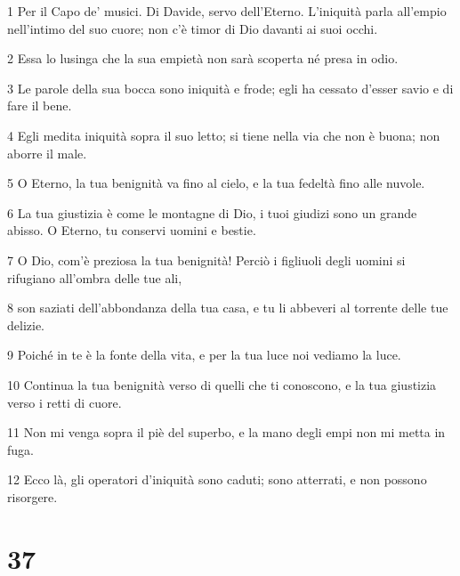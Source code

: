 \par 1 Per il Capo de' musici. Di Davide, servo dell'Eterno. L'iniquità parla all'empio nell'intimo del suo cuore; non c'è timor di Dio davanti ai suoi occhi.
\par 2 Essa lo lusinga che la sua empietà non sarà scoperta né presa in odio.
\par 3 Le parole della sua bocca sono iniquità e frode; egli ha cessato d'esser savio e di fare il bene.
\par 4 Egli medita iniquità sopra il suo letto; si tiene nella via che non è buona; non aborre il male.
\par 5 O Eterno, la tua benignità va fino al cielo, e la tua fedeltà fino alle nuvole.
\par 6 La tua giustizia è come le montagne di Dio, i tuoi giudizi sono un grande abisso. O Eterno, tu conservi uomini e bestie.
\par 7 O Dio, com'è preziosa la tua benignità! Perciò i figliuoli degli uomini si rifugiano all'ombra delle tue ali,
\par 8 son saziati dell'abbondanza della tua casa, e tu li abbeveri al torrente delle tue delizie.
\par 9 Poiché in te è la fonte della vita, e per la tua luce noi vediamo la luce.
\par 10 Continua la tua benignità verso di quelli che ti conoscono, e la tua giustizia verso i retti di cuore.
\par 11 Non mi venga sopra il piè del superbo, e la mano degli empi non mi metta in fuga.
\par 12 Ecco là, gli operatori d'iniquità sono caduti; sono atterrati, e non possono risorgere.

\chapter{37}

